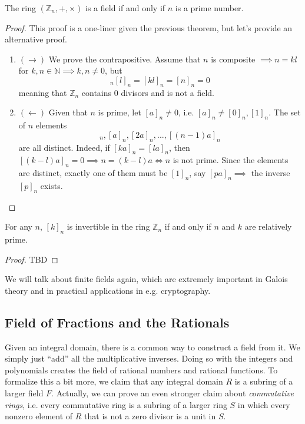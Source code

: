   \begin{corollary}
    The ring $(\mathbb{Z}_{n}, +, \times)$ is a field if and only if $n$ is a prime number. 
  \end{corollary}
  \begin{proof}
    This proof is a one-liner given the previous theorem, but let's provide an alternative proof. 
    \begin{enumerate}
      \item $(\rightarrow)$ We prove the contrapositive. Assume that $n$ is composite $\implies n = k l$ for $k, n \in \mathbb{N} \implies k, n \neq 0$, but 
      \begin{equation}
        [k]_n [l]_n = [k l]_n = [n]_n = 0
      \end{equation}
      meaning that $\mathbb{Z}_n$ contains $0$ divisors and is not a field. 

      \item $(\leftarrow)$ Given that $n$ is prime, let $[a]_n \neq 0$, i.e. $[a]_n \neq [0]_n, [1]_n$. The set of $n$ elements 
      \begin{equation}
        [0]_n, [a]_n, [2a]_n, ..., [(n-1)a]_n
      \end{equation}
      are all distinct. Indeed, if $[k a]_n = [l a]_n$, then $[(k-l) a]_n = 0 \implies n = (k-l) a \iff n$ is not prime. Since the elements are distinct, exactly one of them must be $[1]_n$, say $[p a]_n \implies$ the inverse $[p]_n$ exists. 
    \end{enumerate}
  \end{proof}

  \begin{corollary}
    For any $n$, $[k]_n$ is invertible in the ring $\mathbb{Z}_n$ if and only if $n$ and $k$ are relatively prime. 
  \end{corollary} 
  \begin{proof}
    TBD
  \end{proof}

  We will talk about finite fields again, which are extremely important in Galois theory and in practical applications in e.g. cryptography. 

\subsection{Field of Fractions and the Rationals}

  Given an integral domain, there is a common way to construct a field from it. We simply just ``add'' all the multiplicative inverses. Doing so with the integers and polynomials creates the field of rational numbers and rational functions. To formalize this a bit more, we claim that any integral domain $R$ is a subring of a larger field $F$. Actually, we can prove an even stronger claim about \textit{commutative rings}, i.e. every commutative ring is a subring of a larger ring $S$ in which every nonzero element of $R$ that is not a zero divisor is a unit in $S$. 

